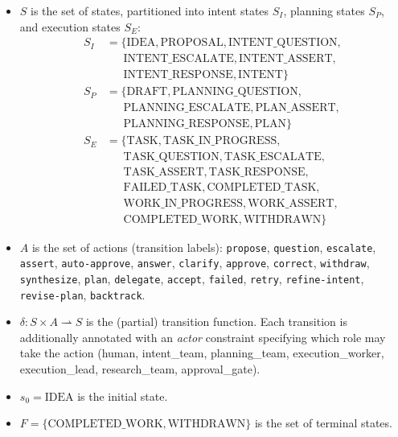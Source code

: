 \documentclass[11pt,a4paper]{article}
\begin{document}
\begin{itemize}
    \item $S$ is the set of states, partitioned into intent states $S_I$,
    planning states $S_P$, and execution states $S_E$:
    \begin{align*}
        S_I &= \{\text{IDEA}, \text{PROPOSAL}, \text{INTENT\_QUESTION}, \\
            &\quad\;\; \text{INTENT\_ESCALATE}, \text{INTENT\_ASSERT}, \\
            &\quad\;\; \text{INTENT\_RESPONSE}, \text{INTENT}\} \\
        S_P &= \{\text{DRAFT}, \text{PLANNING\_QUESTION}, \\
            &\quad\;\; \text{PLANNING\_ESCALATE}, \text{PLAN\_ASSERT}, \\
            &\quad\;\; \text{PLANNING\_RESPONSE}, \text{PLAN}\} \\
        S_E &= \{\text{TASK}, \text{TASK\_IN\_PROGRESS}, \\
            &\quad\;\; \text{TASK\_QUESTION}, \text{TASK\_ESCALATE}, \\
            &\quad\;\; \text{TASK\_ASSERT}, \text{TASK\_RESPONSE}, \\
            &\quad\;\; \text{FAILED\_TASK}, \text{COMPLETED\_TASK}, \\
            &\quad\;\; \text{WORK\_IN\_PROGRESS}, \text{WORK\_ASSERT}, \\
            &\quad\;\; \text{COMPLETED\_WORK}, \text{WITHDRAWN}\}
    \end{align*}

    \item $A$ is the set of actions (transition labels): \texttt{propose},
    \texttt{question}, \texttt{escalate}, \texttt{assert},
    \texttt{auto-approve}, \texttt{answer}, \texttt{clarify},
    \texttt{approve}, \texttt{correct}, \texttt{withdraw},
    \texttt{synthesize}, \texttt{plan}, \texttt{delegate},
    \texttt{accept}, \texttt{failed}, \texttt{retry},
    \texttt{refine-intent}, \texttt{revise-plan}, \texttt{backtrack}.

    \item $\delta: S \times A \rightharpoonup S$ is the (partial) transition
    function. Each transition is additionally annotated with an \emph{actor}
    constraint specifying which role may take the action (human, intent\_team,
    planning\_team, execution\_worker, execution\_lead, research\_team,
    approval\_gate).

    \item $s_0 = \text{IDEA}$ is the initial state.

    \item $F = \{\text{COMPLETED\_WORK}, \text{WITHDRAWN}\}$ is the set of
    terminal states.
\end{itemize}
\end{document}
